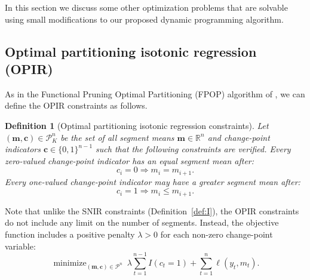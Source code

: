 \documentclass{article}
\newtheorem{definition}{Definition}
\DeclareMathOperator*{\minimize}{minimize}
\newcommand{\RR}{\mathbb R}
\begin{document}
In this section we discuss some other optimization problems that are
solvable using small modifications to our proposed dynamic programming
algorithm.



\subsection{Optimal partitioning isotonic regression (OPIR)}

As in the Functional Pruning Optimal Partitioning (FPOP) algorithm of
\citet{FPOP}, we can define the OPIR constraints as follows.
\begin{definition}[Optimal partitioning isotonic regression constraints]
  \label{def:P}
  Let $(\mathbf m, \mathbf c)\in\mathcal P_K^n$ be the set of all segment means
  $\mathbf m\in\RR^n$ and change-point indicators
  $\mathbf c\in\{0,1\}^{n-1}$ such that the following constraints are
  verified. 
  Every zero-valued change-point indicator has an equal segment mean
  after:
  \begin{equation}
    \label{eq:P_0}
    c_i = 0 \Rightarrow m_i = m_{i+1}.
  \end{equation}
  Every one-valued change-point indicator may have a greater segment
  mean after:
  \begin{equation}
    \label{eq:P_1}
    c_i = 1 \Rightarrow m_i \leq m_{i+1}.
  \end{equation}
\end{definition}
Note that unlike the SNIR constraints (Definition~\ref{def:I}), the
OPIR constraints do not include any limit on the number of
segments. Instead, the objective function includes a positive penalty
$\lambda>0$ for each non-zero change-point variable:
\begin{equation}
    \minimize_{
        (\mathbf m, \mathbf c)\in\mathcal P^n
      } \ 
\lambda\sum_{t=1}^{n-1} I(c_t =1)
+
\sum_{t=1}^n \ell(y_t, m_t).
\end{equation}
\end{document}
